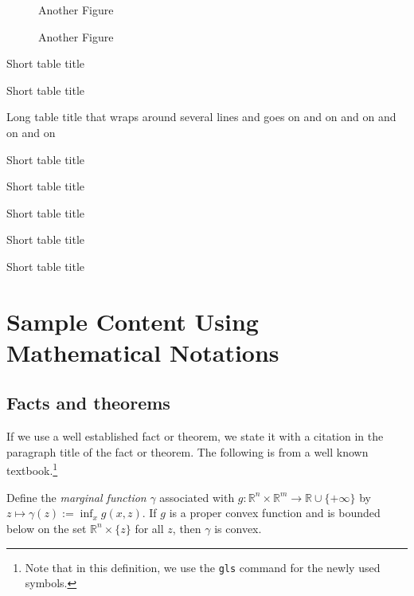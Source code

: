 \documentclass[msc,oneside]{ubcthesis}%
\newcommand{\R}{\mathbb{R}}   %
\begin{document}
\begin{figure}%
\caption{Another Figure}%
\end{figure}

\begin{figure}%
\caption{Another Figure}%
\end{figure}

\begin{table}
\caption{Short table title}
\end{table}
\begin{table}
\caption{Short table title}
\end{table}
\begin{table}
\caption{Long table title that wraps around several lines and goes on and on and on and on and on}
\end{table}
\begin{table}
\caption{Short table title}
\end{table}
\begin{table}
\caption{Short table title}
\end{table}
\begin{table}
\caption{Short table title}
\end{table}
\begin{table}
\caption{Short table title}
\end{table}
\begin{table}
\caption{Short table title}
\end{table}


\chapter{Sample Content Using Mathematical Notations}

\section{Facts and theorems}
If we use a well established fact or theorem, we state it with a citation in the paragraph title of the fact or theorem. The following is from a well known textbook.\footnote{Note that in this definition, we use the \texttt{gls} command for the newly used symbols.}

\begin{fact}\cite[Theorem~IV.2.4.2]{Hiriart-Urruty:1993-ConvexAnalysis}\label{def:marginalfunc}
Define the \emph{marginal function} $\gamma$ associated with $g:\R^n\times\R^m\rightarrow \R\cup
\{+\infty\}$ by $z\mapsto \gamma(z):=\inf_x
g(x,z)$. If $g$ is a proper convex function and is bounded below on the set  $\R^n \times \{z\}$ for all $z$, then $\gamma$ is convex.
\end{fact}
\end{document}

